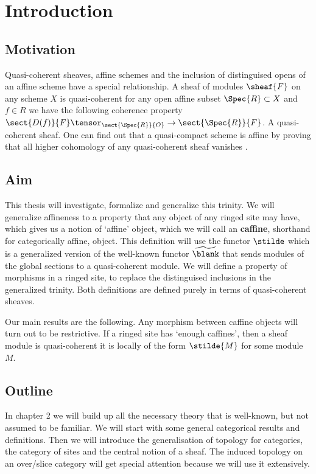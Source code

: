 \chapter{Introduction}

\section{Motivation}
Quasi-coherent sheaves, affine schemes and the inclusion of distinguised opens of an affine scheme have a special relationship. 
A sheaf of modules $\sheaf{F}$ on any scheme $X$ is quasi-coherent 
\iff for any open affine subset $\Spec{R}\subset X$ and $f\in R$ 
we have the following coherence property $\sect{D(f)}{F} \tensor_{\sect{\Spec{R}}{O}} \rightarrow \sect{\Spec{R}}{F}$.
A quasi-coherent sheaf.
One can find out that a quasi-compact scheme is affine by proving that all higher cohomology of any quasi-coherent sheaf vanishes \cite[\href{http://stacks.math.columbia.edu/tag/01XF}{Tag 01XF}]{stacks}.

\section{Aim}
This thesis will investigate, formalize and generalize this trinity. 
We will generalize affineness to a property that any object of any ringed site may have, which gives us a notion of `affine' object, which we will call an \textbf{caffine}, shorthand for categorically affine, object. 
This definition will use the functor $\stilde$ which is a generalized version of the well-known functor $\widetilde{\blank}$ that sends modules of the global sections to a quasi-coherent module.
We will define a property  of morphisms in a ringed site, to replace the distinguised inclusions in the generalized trinity.
Both definitions are defined purely in terms of quasi-coherent sheaves.

Our main results are the following.
Any morphism between caffine objects will turn out to be restrictive.
If a ringed site has `enough caffines', then a sheaf module is quasi-coherent \iff
it is locally of the form $\stilde{M}$ for some module $M$.

\section{Outline}
In chapter 2 we will build up all the necessary theory that is well-known, but not assumed to be familiar.
We will start with some general categorical results and definitions.
Then we will introduce the generalisation of topology for categories, the category of sites and the central notion of a sheaf. The induced topology on an over/slice category will get special attention because we will use it extensively.

